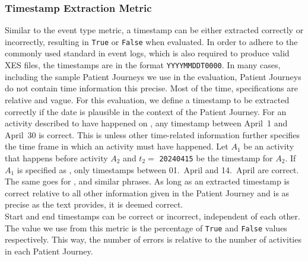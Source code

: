 \subsubsection{Timestamp Extraction Metric}\label{sec:time_metrics}
Similar to the event type metric, a timestamp can be either extracted correctly or incorrectly, resulting in \verb|True| or \verb|False| when evaluated. In order to adhere to the commonly used standard in event logs, which is also required to produce valid XES files, the timestamps are in the format \verb|YYYYMMDDT0000|. In many cases, including the sample Patient Journeys we use in the evaluation, Patient Journeys do not contain time information this precise. Most of the time, specifications are relative and vague. For this evaluation, we define a timestamp to be extracted correctly if the date is plausible in the context of the Patient Journey. For an activity described to have happened on , any timestamp between April~1 and April~30 is correct. This is unless other time-related information further specifies the time frame in which an activity must have happened. Let $A_1$ be an activity that happens before activity $A_2$ and $t_2=$ \verb|20240415| be the timestamp for $A_2$. If $A_1$ is specified as , only timestamps between 01.~April and 14.~April are correct. The same goes for ,  and similar phrases. As long as an extracted timestamp is correct relative to all other information given in the Patient Journey and is as precise as the text provides, it is deemed correct.\\
Start and end timestamps can be correct or incorrect, independent of each other. The value we use from this metric is the percentage of \verb|True| and \verb|False| values respectively. This way, the number of errors is relative to the number of activities in each Patient Journey.

